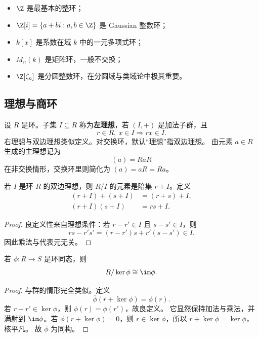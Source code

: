 \begin{example}
\begin{itemize}
  \item $\Z$ 是最基本的整环；
  \item $\Z[i]=\{a+bi:a,b\in\Z\}$ 是 Gaussian 整数环；
  \item $k[x]$ 是系数在域 $k$ 中的一元多项式环；
  \item $M_n(k)$ 是矩阵环，一般不交换；
  \item $\Z[\zeta_n]$ 是分圆整数环，在分圆域与类域论中极其重要。
\end{itemize}
\end{example}

\subsection{理想与商环}

\begin{definition}[理想]
设 $R$ 是环。子集 $I\subseteq R$ 称为\textbf{左理想}，若 $(I,+)$ 是加法子群，且
\[
  r\in R,\ x\in I \Longrightarrow rx\in I.
\]
右理想与双边理想类似定义。对交换环，默认“理想”指双边理想。
由元素 $a\in R$ 生成的主理想记为
\begin{equation}
  (a)=RaR
\end{equation}
在非交换情形，交换环里则简化为 $(a)=aR=Ra$。
\end{definition}

\begin{definition}[商环]
若 $I$ 是环 $R$ 的双边理想，则 $R/I$ 的元素是陪集 $r+I$。定义
\begin{align}
  (r+I)+(s+I)&=(r+s)+I, \\
  (r+I)(s+I)&=rs+I.
\end{align}
\end{definition}

\begin{proof}
良定义性来自理想条件：若 $r-r'\in I$ 且 $s-s'\in I$，则
\[
  rs-r's'=(r-r')s+r'(s-s')\in I.
\]
因此乘法与代表元无关。
\end{proof}

\begin{theorem}
若 $\phi\colon R\to S$ 是环同态，则
\begin{equation}
  R/\ker\phi \cong \im\phi.
\end{equation}
\end{theorem}

\begin{proof}
与群的情形完全类似。定义
\[
  \overline\phi(r+\ker\phi)=\phi(r).
\]
若 $r-r'\in\ker\phi$，则 $\phi(r)=\phi(r')$，故良定义。
它显然保持加法与乘法，并满射到 $\im\phi$。若
$\overline\phi(r+\ker\phi)=0$，则 $r\in\ker\phi$，所以 $r+\ker\phi=\ker\phi$，核平凡。
故 $\overline\phi$ 为同构。
\end{proof}

